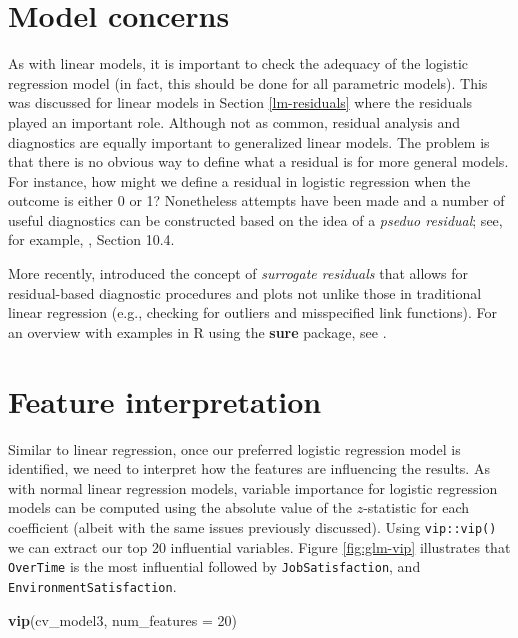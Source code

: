 \documentclass[]{krantz}
\makeatletter
\newenvironment{Shaded}{\begin{snugshade}}{\end{snugshade}}
\newcommand{\DataTypeTok}[1]{\textcolor[rgb]{0.27,0.27,0.27}{#1}}
\newcommand{\DecValTok}[1]{\textcolor[rgb]{0.06,0.06,0.06}{#1}}
\newcommand{\KeywordTok}[1]{\textcolor[rgb]{0.27,0.27,0.27}{\textbf{#1}}}
\newcommand{\NormalTok}[1]{#1}
\newenvironment{kframe}{%
\medskip{}
\setlength{\fboxsep}{.8em}
 \def\at@end@of@kframe{}%
 \ifinner\ifhmode%
  \def\at@end@of@kframe{\end{minipage}}%
  \begin{minipage}{\columnwidth}%
 \fi\fi%
 \def\FrameCommand##1{\hskip\@totalleftmargin \hskip-\fboxsep
 \colorbox{shadecolor}{##1}\hskip-\fboxsep
     \hskip-\linewidth \hskip-\@totalleftmargin \hskip\columnwidth}%
 \MakeFramed {\advance\hsize-\width
   \@totalleftmargin\z@ \linewidth\hsize
   \@setminipage}}%
 {\par\unskip\endMakeFramed%
 \at@end@of@kframe}
\renewenvironment{Shaded}{\begin{kframe}}{\end{kframe}}
\makeatother
\begin{document}
\hypertarget{glm-residuals}{%
\section{Model concerns}\label{glm-residuals}}

As with linear models, it is important to check the adequacy of the logistic regression model (in fact, this should be done for all parametric models). This was discussed for linear models in Section \ref{lm-residuals} where the residuals played an important role. Although not as common, residual analysis and diagnostics are equally important to generalized linear models. The problem is that there is no obvious way to define what a residual is for more general models. For instance, how might we define a residual in logistic regression when the outcome is either 0 or 1? Nonetheless attempts have been made and a number of useful diagnostics can be constructed based on the idea of a \emph{pseduo residual}; see, for example, \citet{harrell2015regression}, Section 10.4.

More recently, \citet{dungang2018residuals} introduced the concept of \emph{surrogate residuals} that allows for residual-based diagnostic procedures and plots not unlike those in traditional linear regression (e.g., checking for outliers and misspecified link functions). For an overview with examples in R using the \textbf{sure} package, see \citet{greenwell2018residuals}.

\hypertarget{feature-interpretation}{%
\section{Feature interpretation}\label{feature-interpretation}}

Similar to linear regression, once our preferred logistic regression model is identified, we need to interpret how the features are influencing the results. As with normal linear regression models, variable importance for logistic regression models can be computed using the absolute value of the \(z\)-statistic for each coefficient (albeit with the same issues previously discussed). Using \texttt{vip::vip()} we can extract our top 20 influential variables. Figure \ref{fig:glm-vip} illustrates that \texttt{OverTime} is the most influential followed by \texttt{JobSatisfaction}, and \texttt{EnvironmentSatisfaction}.

\begin{Shaded}
\begin{Highlighting}[]
\KeywordTok{vip}\NormalTok{(cv_model3, }\DataTypeTok{num_features =} \DecValTok{20}\NormalTok{)}
\end{Highlighting}
\end{Shaded}
\end{document}
